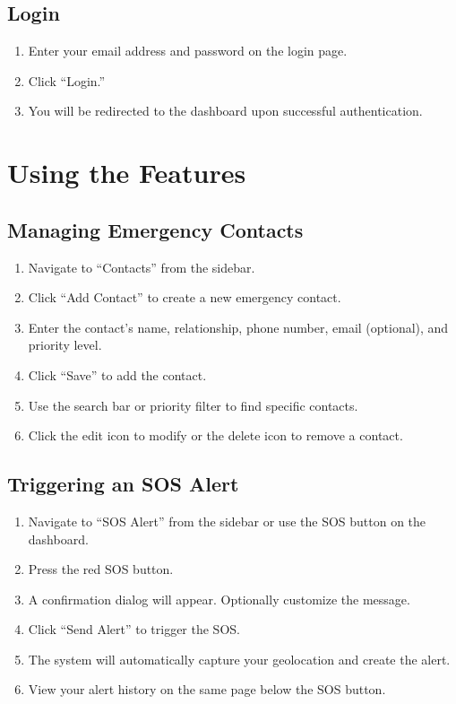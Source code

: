 \subsection{Login}
\begin{enumerate}
  \item Enter your email address and password on the login page.
  \item Click ``Login.''
  \item You will be redirected to the dashboard upon successful authentication.
\end{enumerate}

\section{Using the Features}

\subsection{Managing Emergency Contacts}
\begin{enumerate}
  \item Navigate to ``Contacts'' from the sidebar.
  \item Click ``Add Contact'' to create a new emergency contact.
  \item Enter the contact's name, relationship, phone number, email (optional), and priority level.
  \item Click ``Save'' to add the contact.
  \item Use the search bar or priority filter to find specific contacts.
  \item Click the edit icon to modify or the delete icon to remove a contact.
\end{enumerate}

\subsection{Triggering an SOS Alert}
\begin{enumerate}
  \item Navigate to ``SOS Alert'' from the sidebar or use the SOS button on the dashboard.
  \item Press the red SOS button.
  \item A confirmation dialog will appear. Optionally customize the message.
  \item Click ``Send Alert'' to trigger the SOS.
  \item The system will automatically capture your geolocation and create the alert.
  \item View your alert history on the same page below the SOS button.
\end{enumerate}


